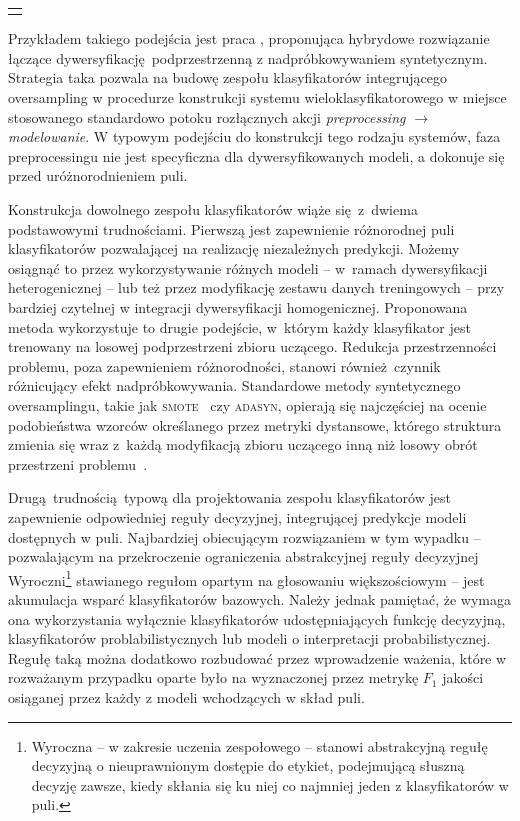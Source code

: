 {
\color{red}
\noindent\begin{tabular}{p{\textwidth}}
	\toprule &
\end{tabular}\vspace{-1em}
}
\noindent Przykładem takiego podejścia jest praca , proponująca hybrydowe rozwiązanie łączące dywersyfikację podprzestrzenną z nadpróbkowywaniem syntetycznym. Strategia taka pozwala na budowę zespołu klasyfikatorów integrującego oversampling w procedurze konstrukcji systemu wieloklasyfikatorowego w miejsce stosowanego standardowo potoku rozłącznych akcji \emph{preprocessing $\rightarrow$ modelowanie}. W typowym podejściu do konstrukcji tego rodzaju systemów, faza preprocessingu nie jest specyficzna dla dywersyfikowanych modeli, a dokonuje się przed uróżnorodnieniem puli.

Konstrukcja dowolnego zespołu klasyfikatorów wiąże się z~dwiema podstawowymi trudnościami. Pierwszą jest zapewnienie różnorodnej puli klasyfikatorów pozwalającej na realizację niezależnych predykcji. Możemy osiągnąć to przez wykorzystywanie różnych modeli -- w~ramach dywersyfikacji heterogenicznej -- lub też przez modyfikację zestawu danych treningowych -- przy bardziej czytelnej w integracji dywersyfikacji homogenicznej. Proponowana metoda wykorzystuje to drugie podejście, w~którym każdy klasyfikator jest trenowany na losowej podprzestrzeni zbioru uczącego. Redukcja przestrzenności problemu, poza zapewnieniem różnorodności, stanowi również czynnik różnicujący efekt nadpróbkowywania. Standardowe metody syntetycznego oversamplingu, takie jak \textsc{smote}~ czy \textsc{adasyn}, opierają się najczęściej na ocenie podobieństwa wzorców określanego przez metryki dystansowe, którego struktura zmienia się wraz z~każdą modyfikacją zbioru uczącego inną niż losowy obrót przestrzeni problemu~.

Drugą trudnością typową dla projektowania zespołu klasyfikatorów jest zapewnienie odpowiedniej reguły decyzyjnej, integrującej predykcje modeli dostępnych w puli. Najbardziej obiecującym rozwiązaniem w tym wypadku -- pozwalającym na przekroczenie ograniczenia abstrakcyjnej reguły decyzyjnej Wyroczni\footnote{Wyroczna -- w zakresie uczenia zespołowego -- stanowi abstrakcyjną regułę decyzyjną o nieuprawnionym dostępie do etykiet, podejmującą słuszną decyzję zawsze, kiedy skłania się ku niej co najmniej jeden z klasyfikatorów w puli.} stawianego regułom opartym na głosowaniu większościowym -- jest akumulacja wsparć klasyfikatorów bazowych. Należy jednak pamiętać, że wymaga ona wykorzystania wyłącznie klasyfikatorów udostępniających funkcję decyzyjną, klasyfikatorów problabilistycznych lub modeli o interpretacji probabilistycznej. Regułę taką można dodatkowo rozbudować przez wprowadzenie ważenia, które w rozważanym przypadku oparte było na wyznaczonej przez metrykę $F_1$ jakości osiąganej przez każdy z modeli wchodzących w skład puli.

